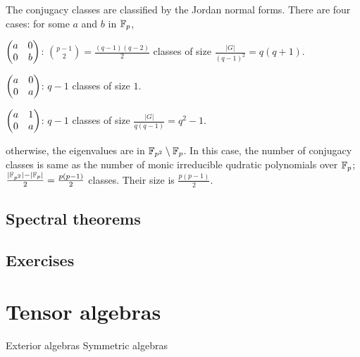 \documentclass{../../large}
\begin{document}
\begin{prb}
The conjugacy classes are classified by the Jordan normal forms.
There are four cases: for some $a$ and $b$ in $\mathbb{F}_p$,
\begin{parts}
\item $\begin{pmatrix}a&0\\0&b\end{pmatrix}$: $\binom{p-1}2=\frac{(q-1)(q-2)}2$ classes of size $\frac{|G|}{(q-1)^2}=q(q+1)$.
\item $\begin{pmatrix}a&0\\0&a\end{pmatrix}$: $q-1$ classes of size $1$.
\item $\begin{pmatrix}a&1\\0&a\end{pmatrix}$: $q-1$ classes of size $\frac{|G|}{q(q-1)}=q^2-1$.
\item otherwise, the eigenvalues are in $\mathbb{F}_{p^2}\setminus\mathbb{F}_p$.
In this case, the number of conjugacy classes is same as the number of monic irreducible qudratic polynomials over $\mathbb{F}_p$; $\frac{|\mathbb{F}_{p^2}|-|\mathbb{F}_p|}2=\frac{p(p-1)}2$ classes.
Their size is $\frac{p(p-1)}2$.
\end{parts}
\end{prb}

\section{Spectral theorems}



\section*{Exercises}




\chapter{Tensor algebras}
Exterior algebras
Symmetric algebras
\end{document}

